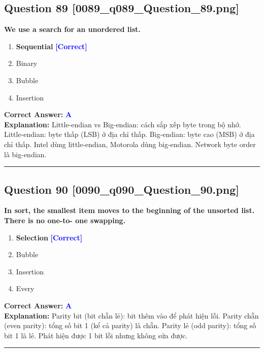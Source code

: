 \documentclass[11pt,a4paper]{article}
\begin{document}
\begin{minipage}{\textwidth}
\subsection*{Question 89 \quad \footnotesize{[0089\_q089\_Question\_89.png]}}
\noindent \textbf{We use a search for an unordered list.}

\begin{enumerate}[label=\Alph*.]
    \item \textbf{Sequential} \hfill \textcolor{blue}{\textbf{[Correct]}}
    \item Binary
    \item Bubble
    \item Insertion
\end{enumerate}

\noindent \textbf{Correct Answer:} \textcolor{blue}{\textbf{A}} \\[2pt]
\noindent \textbf{Explanation:} Little-endian vs Big-endian: cách sắp xếp byte trong bộ nhớ. Little-endian: byte thấp (LSB) ở địa chỉ thấp. Big-endian: byte cao (MSB) ở địa chỉ thấp. Intel dùng little-endian, Motorola dùng big-endian. Network byte order là big-endian.

\par\vspace{0.3cm}
\hrule
\vspace{0.3cm}
\end{minipage}

\begin{minipage}{\textwidth}
\subsection*{Question 90 \quad \footnotesize{[0090\_q090\_Question\_90.png]}}
\noindent \textbf{In sort, the smallest item moves to the beginning of the unsorted list. There is no one-to- one swapping.}

\begin{enumerate}[label=\Alph*.]
    \item \textbf{Selection} \hfill \textcolor{blue}{\textbf{[Correct]}}
    \item Bubble
    \item Insertion
    \item Every
\end{enumerate}

\noindent \textbf{Correct Answer:} \textcolor{blue}{\textbf{A}} \\[2pt]
\noindent \textbf{Explanation:} Parity bit (bit chẵn lẻ): bit thêm vào để phát hiện lỗi. Parity chẵn (even parity): tổng số bit 1 (kể cả parity) là chẵn. Parity lẻ (odd parity): tổng số bit 1 là lẻ. Phát hiện được 1 bit lỗi nhưng không sửa được.

\par\vspace{0.3cm}
\hrule
\vspace{0.3cm}
\end{minipage}
\end{document}
